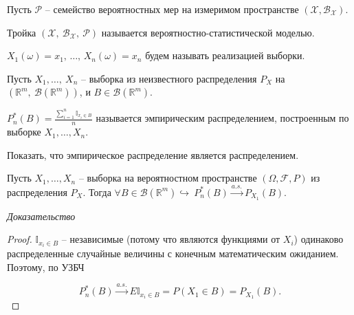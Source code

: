 Пусть $\displaystyle \mathcal{P}$ -- семейство вероятностных мер на измеримом пространстве $\displaystyle (\mathcal{X} ,\mathcal{B}_{\mathcal{X}})$.
\begin{definition}
	Тройка $\displaystyle (\mathcal{X},\ \mathcal{B}_{\mathcal{X}},\ \mathcal{P})$ называется вероятностно-статистической моделью.
\end{definition}
\begin{definition}
	$\displaystyle X_{1}( \omega ) =x_{1},\,\ldots,\, X_{n}(\omega) = x_{n}$ будем называть реализацией выборки.
\end{definition}
Пусть $\displaystyle X_{1} ,\dotsc,\ X_{n}$ -- выборка из неизвестного распределения $\displaystyle P_{X}$ на $\displaystyle \left(\mathbb{R}^{m},\ \mathcal{B}\left(\mathbb{R}^{m}\right)\right)$, и $\displaystyle B\in \mathcal{B}\left(\mathbb{R}^{m}\right)$.
\begin{definition}
	$\displaystyle P_{n}^{*}( B) =\frac{\sum _{i=1}^{n}\mathbb{I}_{x_{i} \in B}}{n}$ называется эмпирическим распределением, построенным по выборке $\displaystyle X_{1} ,\dotsc ,X_{n}$.
\end{definition}
\begin{exercise}
	Показать, что эмпирическое распределение является распределением.
\end{exercise}
\begin{proposition}
	Пусть $\displaystyle X_{1} ,\dotsc ,X_{n}$ -- выборка на вероятностном пространстве $\displaystyle ( \Omega ,\mathcal{F} ,P)$ из распределения $\displaystyle P_{X}$. Тогда $\displaystyle \forall B\in \mathcal{B}\left(\mathbb{R}^{m}\right) \hookrightarrow \ P_{n}^{*}( B)\xrightarrow{a.s.} P_{X_{1}}( B)$.
\end{proposition}
\textit{Доказательство}
\begin{proof}
    $\displaystyle \mathbb{I}_{x_{i} \in B}$ -- независимые (потому что являются функциями от $\displaystyle X_{i}$) одинаково распределенные случайные величины с конечным математическим ожиданием. Поэтому, по УЗБЧ
    
    \begin{equation*}
    	P_{n}^{*}( B)\xrightarrow{a.s.} E\mathbb{I}_{x_{i} \in B} =P( X_{1} \in B) =P_{X_{1}}( B).
    \end{equation*}
\end{proof}

